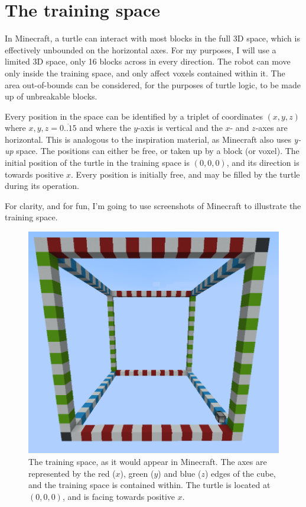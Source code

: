 \documentclass{report}
\begin{document}
\section{The training space}

In Minecraft, a turtle can interact with most blocks in the full 3D space, which is effectively unbounded on the horizontal axes. For my purposes, I will use a limited 3D space, only 16 blocks across in every direction. The robot can move only inside the training space, and only affect voxels contained within it. The area out-of-bounds can be considered, for the purposes of turtle logic, to be made up of unbreakable blocks.

Every position in the space can be identified by a triplet of coordinates $(x, y, z)$ where $x, y, z = \overline{0..15}$ and where the $y$-axis is vertical and the $x$- and $z$-axes are horizontal. This is analogous to the inspiration material, as Minecraft also uses \emph{y-up} space. The positions can either be free, or taken up by a block (or voxel). The initial position of the turtle in the training space is $(0, 0, 0)$, and its direction is towards positive $x$. Every position is initially free, and may be filled by the turtle during its operation.

For clarity, and for fun, I'm going to use screenshots of Minecraft to illustrate the training space.

\begin{figure}[ht]
    \centering
    \includegraphics[scale=0.4]{minecraft1}
    \caption{The training space, as it would appear in Minecraft. The axes are represented by the red ($x$), green ($y$) and blue ($z$) edges of the cube, and the training space is contained within. The turtle is located at $(0, 0, 0)$, and is facing towards positive $x$.}
\end{figure}
\end{document}
